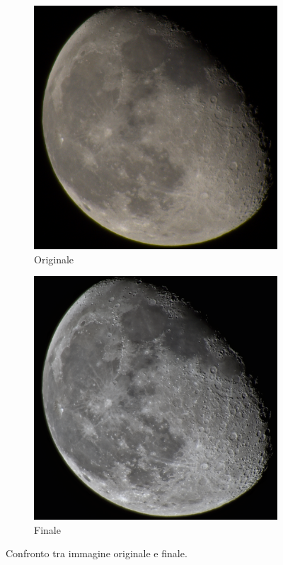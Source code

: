 \begin{figure}[H]
    \centering
    \begin{subfigure}[t]{0.8\textwidth}
        \centering
        \caption{Originale}
        \includegraphics[width=\linewidth]{../assets/original.png}
    \end{subfigure}
    \hfill
    \begin{subfigure}[t]{0.8\textwidth}
        \centering
        \caption{Finale}
        \includegraphics[width=\linewidth]{../assets/output.png}
    \end{subfigure}
    \caption{Confronto tra immagine originale e finale.}
    \label{fig:confronto-finale}
\end{figure}

\cleardoublepage